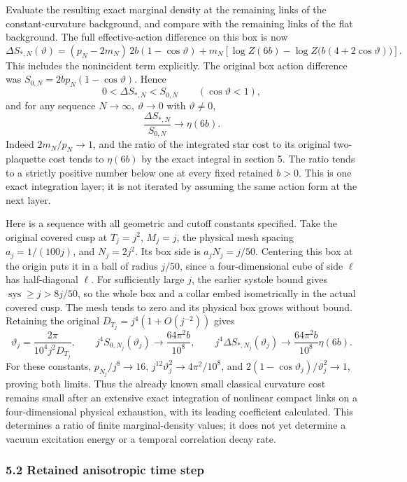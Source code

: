 \documentclass[
  11pt,
]{article}
\begin{document}
Evaluate the resulting exact marginal density at the remaining links of
the constant-curvature background, and compare with the remaining links
of the flat background. The full effective-action difference on this box
is now \[
 \Delta S_{*,N}(\vartheta)
 =(p_N-2m_N)\,2b(1-\cos\vartheta)
   +m_N\left[\log Z(6b)-\log Z\big(b(4+2\cos\vartheta)\big)\right].
\] This includes the nonincident term explicitly. The original box
action difference was \(S_{0,N}=2bp_N(1-\cos\vartheta)\). Hence \[
 0<\Delta S_{*,N}<S_{0,N}\qquad(\cos\vartheta<1),
\] and for any sequence \(N\to\infty\), \(\vartheta\to0\) with
\(\vartheta\ne0\), \[
 \frac{\Delta S_{*,N}}{S_{0,N}}\longrightarrow\eta(6b).
\] Indeed \(2m_N/p_N\to1\), and the ratio of the integrated star cost to
its original two-plaquette cost tends to \(\eta(6b)\) by the exact
integral in section 5. The ratio tends to a strictly positive number
below one at every fixed retained \(b>0\). This is one exact integration
layer; it is not iterated by assuming the same action form at the next
layer.

Here is a sequence with all geometric and cutoff constants specified.
Take the original covered cusp at \(T_j=j^2\), \(M_j=j\), the physical
mesh spacing \(a_j=1/(100j)\), and \(N_j=2j^2\). Its box side is
\(a_jN_j=j/50\). Centering this box at the origin puts it in a ball of
radius \(j/50\), since a four-dimensional cube of side \(\ell\) has
half-diagonal \(\ell\). For sufficiently large \(j\), the earlier
systole bound gives \(\operatorname{sys}\geq j>8j/50\), so the whole box
and a collar embed isometrically in the actual covered cusp. The mesh
tends to zero and its physical box grows without bound. Retaining the
original \(D_{T_j}=j^4(1+O(j^{-2}))\) gives \[
 \vartheta_j=\frac{2\pi}{10^4 j^2D_{T_j}},\qquad
 j^4S_{0,N_j}(\vartheta_j)
     \longrightarrow\frac{64\pi^2b}{10^8},\qquad
 j^4\Delta S_{*,N_j}(\vartheta_j)
     \longrightarrow\frac{64\pi^2b}{10^8}\eta(6b).
\] For these constants, \(p_{N_j}/j^8\to16\),
\(j^{12}\vartheta_j^2\to4\pi^2/10^8\), and
\(2(1-\cos\vartheta_j)/\vartheta_j^2\to1\), proving both limits. Thus
the already known small classical curvature cost remains small after an
extensive exact integration of nonlinear compact links on a
four-dimensional physical exhaustion, with its leading coefficient
calculated. This determines a ratio of finite marginal-density values;
it does not yet determine a vacuum excitation energy or a temporal
correlation decay rate.

\subsubsection{5.2 Retained anisotropic time
step}\label{retained-anisotropic-time-step}
\end{document}

